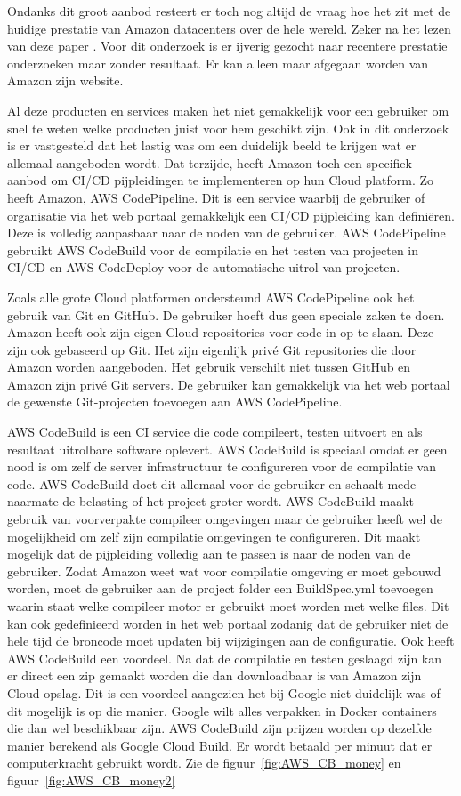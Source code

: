 Ondanks dit groot aanbod resteert er toch nog altijd de vraag hoe het zit met de huidige prestatie van Amazon datacenters over de hele wereld. Zeker na het lezen van deze paper \autocite{Jackson2010}. Voor dit onderzoek is er ijverig gezocht naar recentere prestatie onderzoeken maar zonder resultaat. Er kan alleen maar afgegaan worden van Amazon zijn website.

Al deze producten en services maken het niet gemakkelijk voor een gebruiker om snel te weten welke producten juist voor hem geschikt zijn. Ook in dit onderzoek is er vastgesteld dat het lastig was om een duidelijk beeld te krijgen wat er allemaal aangeboden wordt. Dat terzijde, heeft Amazon toch een specifiek aanbod om CI/CD pijpleidingen te implementeren op hun Cloud platform. Zo heeft Amazon, AWS CodePipeline. Dit is een service waarbij de gebruiker of organisatie via het web portaal gemakkelijk een CI/CD pijpleiding kan definiëren. Deze is volledig aanpasbaar naar de noden van de gebruiker. AWS CodePipeline gebruikt AWS CodeBuild voor de compilatie en het testen van projecten in CI/CD en AWS CodeDeploy voor de automatische uitrol van projecten.

Zoals alle grote Cloud platformen ondersteund AWS CodePipeline ook het gebruik van Git en GitHub. De gebruiker hoeft dus geen speciale zaken te doen. Amazon heeft ook zijn eigen Cloud repositories voor code in op te slaan. Deze zijn ook gebaseerd op Git. Het zijn eigenlijk privé Git repositories die door Amazon worden aangeboden. Het gebruik verschilt niet tussen GitHub en Amazon zijn privé Git servers. De gebruiker kan gemakkelijk via het web portaal de gewenste Git-projecten toevoegen aan AWS CodePipeline.

AWS CodeBuild is een CI service die code compileert, testen uitvoert en als resultaat uitrolbare software oplevert. AWS CodeBuild is speciaal omdat er geen nood is om zelf de server infrastructuur te configureren voor de compilatie van code. AWS CodeBuild doet dit allemaal voor de gebruiker en schaalt mede naarmate de belasting of het project groter wordt. AWS CodeBuild maakt gebruik van voorverpakte compileer omgevingen maar de gebruiker heeft wel de mogelijkheid om zelf zijn compilatie omgevingen te configureren. Dit maakt mogelijk dat de pijpleiding volledig aan te passen is naar de noden van de gebruiker. Zodat Amazon weet wat voor compilatie omgeving er moet gebouwd worden, moet de gebruiker aan de project folder een BuildSpec.yml toevoegen waarin staat welke compileer motor er gebruikt moet worden met welke files. Dit kan ook gedefinieerd worden in het web portaal zodanig dat de gebruiker niet de hele tijd de broncode moet updaten bij wijzigingen aan de configuratie. Ook heeft AWS CodeBuild een voordeel. Na dat de compilatie en testen geslaagd zijn kan er direct een zip gemaakt worden die dan downloadbaar is van Amazon zijn Cloud opslag. Dit is een voordeel aangezien het bij Google niet duidelijk was of dit mogelijk is op die manier. Google wilt alles verpakken in Docker containers die dan wel beschikbaar zijn. AWS CodeBuild zijn prijzen worden op dezelfde manier berekend als Google Cloud Build. Er wordt betaald per minuut dat er computerkracht gebruikt wordt. Zie de figuur~\ref{fig:AWS_CB_money} en figuur~\ref{fig:AWS_CB_money2}

